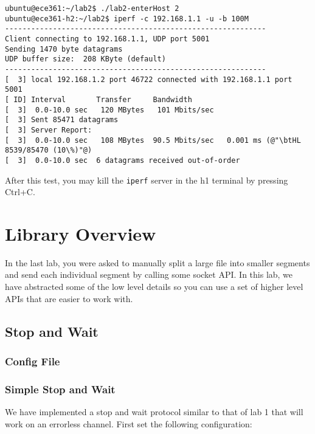 \documentclass[11pt]{article}
\begin{document}
\begin{lstlisting}[style=ece361shell, caption={Running an \texttt{iperf} client in h2.}, label={lst:iperf-client}]
ubuntu@ece361:~/lab2$ ./lab2-enterHost 2
ubuntu@ece361-h2:~/lab2$ iperf -c 192.168.1.1 -u -b 100M
------------------------------------------------------------
Client connecting to 192.168.1.1, UDP port 5001
Sending 1470 byte datagrams
UDP buffer size:  208 KByte (default)
------------------------------------------------------------
[  3] local 192.168.1.2 port 46722 connected with 192.168.1.1 port 5001
[ ID] Interval       Transfer     Bandwidth
[  3]  0.0-10.0 sec   120 MBytes   101 Mbits/sec
[  3] Sent 85471 datagrams
[  3] Server Report:
[  3]  0.0-10.0 sec   108 MBytes  90.5 Mbits/sec   0.001 ms (@"\btHL 8539/85470 (10\%)"@)
[  3]  0.0-10.0 sec  6 datagrams received out-of-order
\end{lstlisting}

After this test, you may kill the \texttt{iperf} server in the h1 terminal by pressing Ctrl+C.


\section{Library Overview}
In the last lab, you were asked to manually split a large file into smaller segments and send each individual segment by calling some socket API. In this lab, we have abstracted some of the low level details so you can use a set of higher level APIs that are easier to work with.

\subsection{Stop and Wait}
\subsubsection{Config File}


\subsubsection{Simple Stop and Wait}
We have implemented a stop and wait protocol similar to that of lab 1 that will work on an errorless channel. First set the following configuration:
\end{document}
